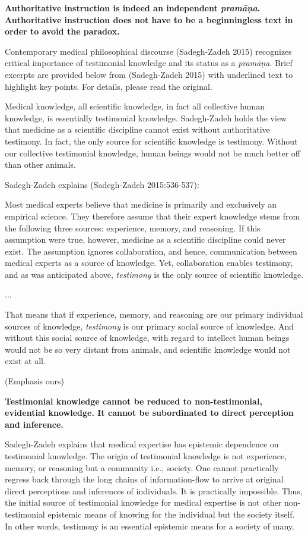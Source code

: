 {\bf Authoritative instruction is indeed an independent {{\sl\bfseries pramāṇa}\relax}.  Authoritative instruction does not have to be a beginningless text in order to avoid the paradox.}

\newpage

Contemporary medical philosophical discourse (Sadegh-Zadeh 2015) recognizes critical importance of testimonial knowledge and its status as a {\sl pramāṇa}.  Brief excerpts are provided below from (Sadegh-Zadeh 2015) with underlined text to highlight key points. For details, please read the original.
  
Medical knowledge, all scientific knowledge, in fact all collective human knowledge, is essentially testimonial knowledge. Sadegh-Zadeh holds the view that medicine as a scientific discipline cannot exist without authoritative testimony. In fact, the only source for scientific knowledge is testimony. Without our collective testimonial knowledge, human beings would not be much better off than other animals.  

Sadegh-Zadeh explains (Sadegh-Zadeh 2015:536-537):
\begin{myquote}
Most medical experts believe that medicine is primarily and exclusively an empirical science.  They therefore assume that their expert knowledge stems from the following three sources: experience, memory, and reasoning. If this assumption were true, however, medicine as a scientific discipline could never exist. The assumption ignores collaboration, and hence, communication between medical experts as a source of knowledge. Yet, collaboration enables testimony, and as was anticipated above, {\sl testimony} is the only source of scientific knowledge.

...

That means that if experience, memory, and reasoning are our primary individual sources of knowledge, {\sl testimony} is our primary social source of knowledge.  And without this social source of knowledge, with regard to intellect human beings would not be so very distant from animals, and scientific knowledge would not exist at all.

\hfill (Emphasis ours)
\end{myquote}

{\bf Testimonial knowledge cannot be reduced to non-testimonial, evidential knowledge. It cannot be subordinated to direct perception and inference.}

Sadegh-Zadeh explains that medical expertise has epistemic dependence on testimonial knowledge.  The origin of testimonial knowledge is not experience, memory, or reasoning but a community i.e., society.  One cannot practically regress back through the long chains of information-flow to arrive at original direct perceptions and inferences of individuals.  It is practically impossible.  Thus, the initial source of testimonial knowledge for medical expertise is not other non-testimonial epistemic means of knowing for the individual but the society itself.  In other words, testimony is an essential epistemic means for a society of many.

